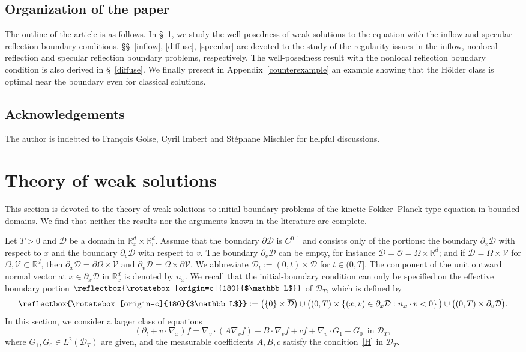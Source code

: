 \documentclass[10pt]{amsart}
\theoremstyle{definition}\newtheorem{defi}[theo]{Definition}\newtheorem{rema}[theo]{Remark}\newtheorem{exam}[theo]{Example}\newtheorem{exem}[theo]{Example}\newtheorem{nota}[theo]{Notation}
\newcommand*\p{\partial}
\newcommand*\R {\mathbb{R}}
\newcommand*\V {\mathcal{V}}
\newcommand*\D {\mathcal{D}}
\newcommand*\OO {\mathcal{O}}
\newcommand\GG{\reflectbox{\rotatebox[origin=c]{180}{$\mathbb L$}}}
\begin{document}
\subsection{Organization of the paper} 

The outline of the article is as follows. In \S~\ref{EC}, we study the well-posedness of weak solutions to the equation with the inflow and specular reflection boundary conditions. \S\S~\ref{inflow}, \ref{diffuse}, \ref{specular} are devoted to the study of the regularity issues in the inflow, nonlocal reflection and specular reflection boundary problems, respectively. The well-posedness result with the nonlocal reflection boundary condition is also derived in \S~\ref{diffuse}. We finally present in Appendix~\ref{counterexample} an example showing that the H\"older class is optimal near the boundary even for classical solutions.

\subsection*{Acknowledgements}

The author is indebted to François Golse, Cyril Imbert and Stéphane Mischler for helpful discussions.

\section{Theory of weak solutions}\label{EC}
This section is devoted to the theory of weak solutions to initial-boundary problems of the kinetic Fokker--Planck type equation in bounded domains. We find that neither the results nor the arguments known in the literature are complete.

Let $T>0$ and $\D$ be a domain in $\R^d_x\times\R^d_v$. Assume that the boundary $\p\D$ is $C^{0,1}$ and consists only of the portions: the boundary $\p_x\D$ with respect to $x$ and the boundary $\p_v\D$ with respect to $v$. The boundary $\p_v\D$ can be empty, for instance $\D=\OO=\Omega\times\R^d$; and if $\D=\Omega\times\V$ for $\Omega,\V\subset\R^d$, then $\p_x\D=\p\Omega\times\V$ and $\p_v\D=\Omega\times\p\V$. We abbreviate $\D_t:=(0,t)\times\D$ for $t\in(0,T]$. The component of the unit outward normal vector at $x\in\p_x\D$ in $\R_x^d$ is denoted by $n_x$. We recall that the initial-boundary condition can only be specified on the effective boundary portion $\GG$ of $\D_T$, which is defined by
\begin{align*}
\GG:=\left(\{0\}\times\overline{\D}\right)
\cup\big((0,T)\times\left\{(x,v)\in\p_x\D:n_x\cdot v<0\right\}\big)
\cup\big((0,T)\times\p_v\D\big).
\end{align*}
In this section, we consider a larger class of equations
\begin{equation}\label{existence}
(\partial_t+v\cdot\nabla_x)f =\nabla_v\cdot\left(A\nabla_v f\right) +B\cdot\nabla_vf +cf +\nabla_v\cdot G_1 +G_0\ \; \text{in}\;\D_T,
\end{equation}
where $G_1,G_0\in L^2(\D_T)$ are given, and the measurable coefficients $A,B,c$ satisfy the condition~\eqref{H} in $\D_T$.
\end{document}
